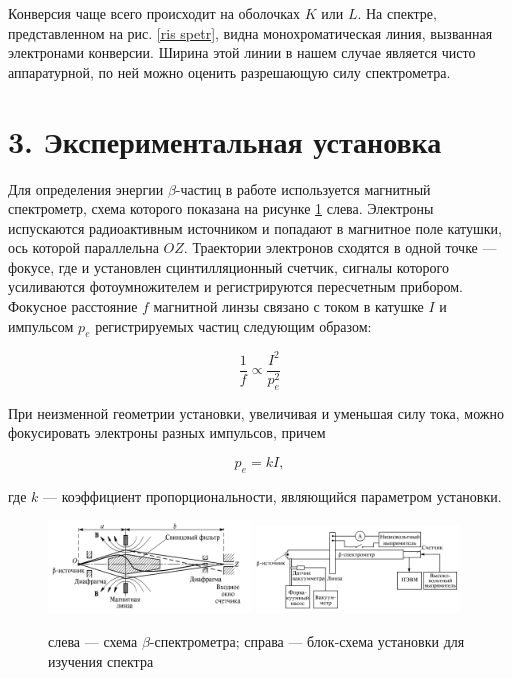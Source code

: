\documentclass[a4paper,12pt]{report}
\begin{document}
Конверсия чаще всего происходит на оболочках $ K $ или $ L $. На спектре, представленном на рис. \ref{ris spetr}, видна монохроматическая линия, вызванная электронами конверсии. Ширина этой линии в нашем случае является чисто аппаратурной, по ней можно оценить разрешающую силу спектрометра.


\section*{3. Экспериментальная установка}
Для определения энергии $\beta$-частиц в работе используется магнитный спектрометр, схема которого показана на рисунке \ref{pic:scheme} слева. Электроны испускаются радиоактивным источником и попадают в магнитное поле катушки, ось которой параллельна $OZ$. Траектории электронов сходятся в одной точке --- фокусе, где и установлен сцинтилляционный счетчик, сигналы которого усиливаются фотоумножителем и регистрируются пересчетным прибором. Фокусное расстояние $f$ магнитной линзы связано с током в катушке $I$ и импульсом $p_e$ регистрируемых частиц следующим образом:
	
	\[ \frac{1}{f} \propto \frac{I^2}{p_e^2} \]  
	
	При неизменной геометрии установки, увеличивая и уменьшая силу тока, можно фокусировать электроны разных импульсов, причем 
	
	\begin{equation}\label{k}
	p_e = kI,
	\end{equation}
	
	 где $k$ --- коэффициент пропорциональности, являющийся параметром установки.

	\begin{figure}[h]
	\centering
	\includegraphics[width=0.48\textwidth]{lab}
	\hfill
	\includegraphics[width=0.48\textwidth]{lab2}
	\caption{слева --- схема $\beta$-спектрометра; справа --- блок-схема установки для изучения спектра}
	\label{pic:scheme}
\end{figure}
\end{document}
